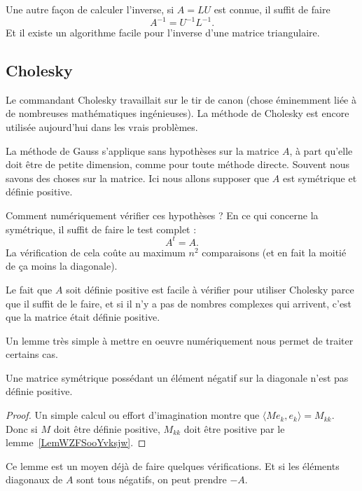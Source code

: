 Une autre façon de calculer l'inverse, si \( A=LU\) est connue, il suffit de faire
\begin{equation}
	A^{-1}=U^{-1}L^{-1}.
\end{equation}
Et il existe un algorithme facile pour l'inverse d'une matrice triangulaire.

\subsection{Cholesky}

Le commandant Cholesky travaillait sur le tir de canon (chose éminemment liée à de nombreuses mathématiques ingénieuses). La méthode de Cholesky est encore utilisée aujourd'hui dans les vrais problèmes.

La méthode de Gauss s'applique sans hypothèses sur la matrice \( A\), à part qu'elle doit être de petite dimension, comme pour toute méthode directe. Souvent nous savons des choses sur la matrice. Ici nous allons supposer que \( A\) est symétrique et définie positive.

Comment numériquement vérifier ces hypothèses ? En ce qui concerne la symétrique, il suffit de faire le test complet :
\begin{equation}
	A^t=A.
\end{equation}
La vérification de cela coûte au maximum \( n^2\) comparaisons (et en fait la moitié de ça moins la diagonale).

Le fait que \( A\) soit définie positive est facile à vérifier pour utiliser Cholesky parce que il suffit de le faire, et si il n'y a pas de nombres complexes qui arrivent, c'est que la matrice était définie positive.

Un lemme très simple à mettre en oeuvre numériquement nous permet de traiter certains cas.
\begin{lemma}
	Une matrice symétrique possédant un élément négatif sur la diagonale n'est pas définie positive.
\end{lemma}

\begin{proof}
	Un simple calcul ou effort d'imagination montre que \( \langle Me_k, e_k\rangle =M_{kk}\). Donc si \( M\) doit être définie positive, \( M_{kk}\) doit être positive par le lemme~\ref{LemWZFSooYvksjw}.
\end{proof}
Ce lemme est un moyen déjà de faire quelques vérifications. Et si les éléments diagonaux de \( A\) sont tous négatifs, on peut prendre \( -A\).

